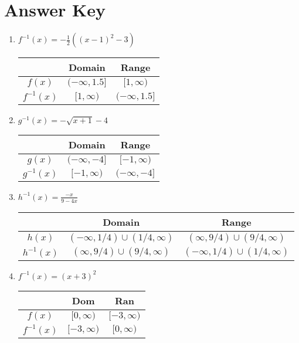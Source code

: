 \newpage

\section{Answer Key}

\begin{enumerate}	\setlength{\itemsep}{15pt}
	\item $f^{-1}(x) = -\frac{1}{2}\left((x-1)^2-3\right)$ \newline\\
     \begin{tabular}{c|c|c}
         &   Domain  &   Range   \\  \hline
         $f(x)$ & $(-\infty, 1.5]$ & $[1, \infty)$ \\ \hline
         $f^{-1}(x)$ & $[1, \infty)$ & $(-\infty, 1.5]$ \\ 
     \end{tabular}
     
     \item $g^{-1}(x) = -\sqrt{x+1}-4$   \newline\\
     \begin{tabular}{c|c|c}
         &   Domain  &   Range   \\  \hline
         $g(x)$ & $(-\infty, -4]$ & $[-1, \infty)$ \\ \hline
         $g^{-1}(x)$ & $[-1, \infty)$ & $(-\infty, -4]$ \\ 
     \end{tabular}
     
     \item $h^{-1}(x) = \frac{-x}{9-4x}$ \newline\\
     \begin{tabular}{c|c|c}
         &   Domain  &   Range   \\  \hline
         $h(x)$ & $(-\infty, 1/4) \cup (1/4, \infty) $ & $(\infty, 9/4) \cup (9/4, \infty)$ \\ \hline
         $h^{-1}(x)$ & $(\infty, 9/4) \cup (9/4, \infty)$ & $(-\infty, 1/4) \cup (1/4, \infty) $ \\ 
     \end{tabular}
         
     \item $f^{-1}(x) = (x+3)^2$ \newline\\
	\begin{tabular}{c|c|c}
            &   Dom             &   Ran \\  \hline
    $f(x)$  &   $[0,\infty)$    &   $[-3,\infty)$   \\  \hline
    $f^{-1}(x)$ &   $[-3,\infty)$   &   $[0,\infty)$    \\
\end{tabular}
     

\end{enumerate}
